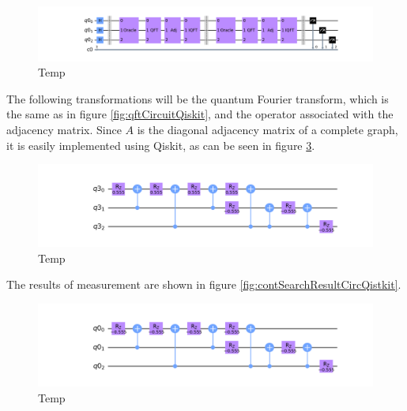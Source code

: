 \documentclass[../../dissertation.tex]{subfiles}
\begin{document}
\begin{figure}[!h]
	\centering
	\includegraphics[scale=0.34]{img/Qiskit/ContQuantumWalk/Search/Circuits/circContSearch_N3_S2.png}
	\caption{Temp}
	\label{fig:contSearchCircQistkit}
\end{figure}
The following transformations will be the quantum Fourier transform, which is the same as in figure \ref{fig:qftCircuitQiskit}, and the operator associated with the adjacency matrix. Since $A$ is the diagonal adjacency matrix of a complete graph, it is easily implemented using Qiskit, as can be seen in figure \ref{fig:contSearchAdjCircQistkit}.
\begin{figure}[!h]
	\centering
	\includegraphics[scale=0.34]{img/Qiskit/ContQuantumWalk/Search/Circuits/circOracle_N3_S2.png}
	\caption{Temp}
	\label{fig:contSearchOracleCircQistkit}
\end{figure}
\par
The results of measurement are shown in figure \ref{fig:contSearchResultCircQistkit}. 

\begin{figure}[!h]
	\centering
	\includegraphics[scale=0.34]{img/Qiskit/ContQuantumWalk/Search/Circuits/circAjd_N3_S2.png}
	\caption{Temp}
	\label{fig:contSearchAdjCircQistkit}
\end{figure}
\end{document}
